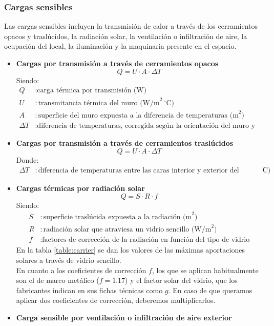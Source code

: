 \subsubsection{Cargas sensibles}
Las cargas sensibles incluyen la transmisión de calor a través de los cerramientos
opacos y traslúcidos, la radiación solar, la ventilación o infiltración de aire, la
ocupación del local, la iluminación y la maquinaria presente en el espacio.

\begin{itemize}
	\item \textbf{Cargas por transmisión a través de cerramientos opacos}
\begin{equation} \label{eq:carga_transmision_opacos}
	Q = U \cdot A \cdot \Delta T
\end{equation}
Siendo:
\begin{align*}
	Q & : \text{carga térmica por transmisión (W)} \\
	U & : \text{transmitancia térmica del muro (W/m}^2 \, ^\circ\text{C)} \\
	A & : \text{superficie del muro expuesta a la diferencia de temperaturas (m}^2\text{)} \\
\Delta T & : \text{diferencia de temperaturas, corregida según la orientación del muro y su peso}
\end{align*}

\item \textbf{Cargas por transmisión a través de cerramientos traslúcidos}
\begin{equation} \label{eq:carga_transmision_traslucidos}
	Q = U \cdot A \cdot \Delta T
\end{equation}
Donde:
\begin{align*}
	\Delta T & : \text{diferencia de temperaturas entre las caras interior y exterior del cerramiento (}^\circ\text{C)}
\end{align*}

\item \textbf{Cargas térmicas por radiación solar}
\begin{equation} \label{eq:carga_radiacion_solar}
	Q = S \cdot R \cdot f
\end{equation}
Siendo:
\begin{align*}
	S & : \text{superficie traslúcida expuesta a la radiación (m}^2\text{)} \\
	R & : \text{radiación solar que atraviesa un vidrio sencillo (W/m}^2\text{)} \\
	f & : \text{factores de corrección de la radiación en función del tipo de vidrio}
\end{align*}
En la tabla \ref{table:carrier} se dan los valores de las máximas aportaciones solares a través de vidrio sencillo.\\
En cuanto a los coeficientes de corrección $f$, los que se aplican habitualmente son el de marco metálico ($f = 1{.}17$) y el factor solar del vidrio, que los fabricantes indican en sus fichas técnicas como $g$. En caso de que queramos aplicar dos coeficientes de corrección, deberemos multiplicarlos.
\item \textbf{Carga sensible por ventilación o infiltración de aire exterior}


\end{itemize}
